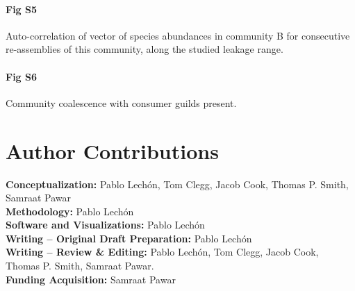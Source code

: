 \documentclass[10pt,letterpaper]{article}
\begin{document}
\paragraph*{Fig S5} Auto-correlation of vector of species abundances in community B for consecutive re-assemblies of this community, along the studied leakage range.
\label{fig:S5Fig}
\paragraph*{Fig S6} Community coalescence with consumer guilds present.
\label{S6Fig}

\section*{Author Contributions}
\textbf{Conceptualization:} Pablo Lechón, Tom Clegg, Jacob Cook, Thomas P. Smith, Samraat Pawar\\[10pt]
\hspace{-14pt}\textbf{Methodology:} Pablo Lechón \\[10pt]
\hspace{-14pt}\textbf{Software and Visualizations:} Pablo Lechón \\[10pt]
\hspace{-14pt}\textbf{Writing – Original Draft Preparation:} Pablo Lechón \\[10pt]
\hspace{-14pt}\textbf{Writing – Review \& Editing:} Pablo Lechón, Tom Clegg, Jacob Cook, Thomas P. Smith, Samraat Pawar. \\[10pt]
\hspace{-14pt}\textbf{Funding Acquisition:} Samraat Pawar \\[10pt]

\newpage 

\nolinenumbers
\end{document}
